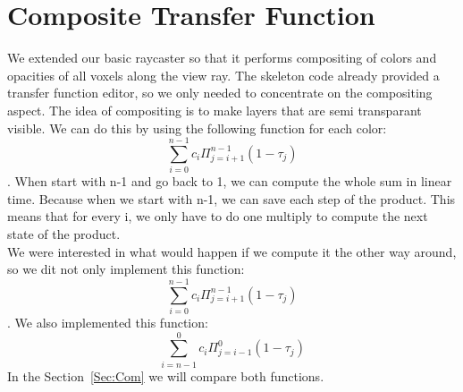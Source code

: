 \section{Composite Transfer Function}\label{Sec:Ctf}
We extended our basic raycaster so that it performs compositing of colors and opacities of all voxels along the view ray.
The skeleton code already provided a transfer function editor, so we only needed to concentrate on the compositing aspect.
The idea of compositing is to make layers that are semi transparant visible. 
We can do this by using the following function for each color: 
$$\sum_{i=0}^{n-1} c_{i}\Pi_{j=i+1}^{n-1}(1-\tau_{j})  $$.
When start with n-1 and go back to 1, we can compute the whole sum in linear time. 
Because when we start with n-1, we can save each step of the product.
This means that for every i, we only have to do one multiply to compute the next state of the product.\\
We were interested in what would happen if we compute it the other way around, so we dit not only implement this function: \\
$$\sum_{i=0}^{n-1} c_{i}\Pi_{j=i+1}^{n-1}(1-\tau_{j})  $$. 
We also implemented this function: \\
$$\sum_{i=n-1}^{0} c_{i}\Pi_{j=i-1}^{0}(1-\tau_{j})  $$
In the Section~\ref{Sec:Com} we will compare both functions.




